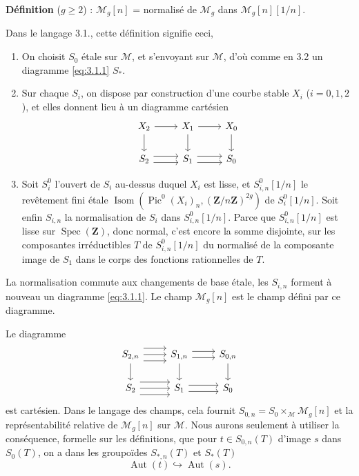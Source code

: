 \documentclass[12pt,a4paper]{article}
\theoremstyle{plain}
\theoremstyle{definition}
\theoremstyle{remark}
\DeclareMathOperator{\Isom}{Isom}
\DeclareMathOperator{\Pic}{Pic}
\DeclareMathOperator{\Aut}{Aut}
\DeclareMathOperator{\Spec}{Spec}
\begin{document}
\textbf{Définition} ($g \geq 2$) : $\mathcal{M}_g[n]$ = normalisé de $\mathcal{M}_g$ dans $\mathcal{M}_g[n][1/n]$.

Dans le langage 3.1., cette définition signifie ceci,

\begin{enumerate}[label=(\alph*)]
\item On choisit $S_0$ étale sur $\mathcal{M}$, et s'envoyant sur $\mathcal{M}$, d'où comme en 3.2 un diagramme \eqref{eq:3.1.1} $S_*$.
\item Sur chaque $S_i$, on dispose par construction d'une courbe stable $X_i$ ($i = 0,1,2$), et elles donnent lieu à un diagramme cartésien
\[
\begin{tikzcd}
X_2 \arrow[r] \arrow[d] & X_1 \arrow[r] \arrow[d] & X_0 \arrow[d] \\
S_2 \arrow[r, shift left=0.75ex] \arrow[r, shift right=0.75ex] & S_1 \arrow[r, shift left=0.75ex] \arrow[r, shift right=0.75ex] & S_0
\end{tikzcd}
\]
\item Soit $S_i^0$ l'ouvert de $S_i$ au-dessus duquel $X_i$ est lisse, et $S_{i,n}^0[1/n]$ le revêtement fini étale $\Isom(\Pic^0(X_i)_n, (\mathbf{Z}/n\mathbf{Z})^{2g})$ de $S_i^0[1/n]$. Soit enfin $S_{i,n}$ la normalisation de $S_i$ dans $S_{i,n}^0[1/n]$. Parce que $S_{i,n}^0[1/n]$ est lisse sur $\Spec(\mathbf{Z})$, donc normal, c'est encore la somme disjointe, sur les composantes irréductibles $T$ de $S_{i,n}^0[1/n]$ du normalisé de la composante image de $S_1$ dans le corps des fonctions rationnelles de $T$.
\end{enumerate}

La normalisation commute aux changements de base étale, les $S_{i,n}$ forment à nouveau un diagramme \eqref{eq:3.1.1}. Le champ $\mathcal{M}_g[n]$ est le champ défini par ce diagramme.

Le diagramme
\[
\begin{tikzcd}
S_{2,n} \arrow[r, shift left=1.5ex] \arrow[r] \arrow[r, shift right=1.5ex] \arrow[d] & S_{1,n} \arrow[r, shift left=0.75ex] \arrow[r, shift right=0.75ex] \arrow[d] & S_{0,n} \arrow[d] \\
S_2 \arrow[r, shift left=1.5ex] \arrow[r] \arrow[r, shift right=1.5ex] & S_1 \arrow[r, shift left=0.75ex] \arrow[r, shift right=0.75ex] & S_0
\end{tikzcd}
\]
est cartésien. Dans le langage des champs, cela fournit $S_{0,n} = S_0 \times_{\mathcal{M}} \mathcal{M}_g[n]$ et la représentabilité relative de $\mathcal{M}_g[n]$ sur $\mathcal{M}$. Nous aurons seulement à utiliser la conséquence, formelle sur les définitions, que pour $t \in S_{0,n}(T)$ d'image $s$ dans $S_0(T)$, on a dans les groupoïdes $S_{*,n}(T)$ et $S_*(T)$
\begin{equation}\label{eq:3.4.1}
\Aut(t) \hookrightarrow \Aut(s).
\end{equation}
\end{document}
